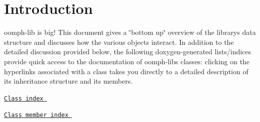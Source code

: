 \hypertarget{index_intro}{}\section{Introduction}\label{index_intro}
{\ttfamily oomph-\/lib} is big! This document gives a \char`\"{}bottom up\char`\"{} overview of the library\textquotesingle{}s data structure and discusses how the various objects interact. In addition to the detailed discussion provided below, the following doxygen-\/generated lists/indices provide quick access to the documentation of {\ttfamily oomph-\/lib\textquotesingle{}s} classes\+: clicking on the hyperlinks associated with a class takes you directly to a detailed description of its inheritance structure and its members.


\begin{DoxyItemize}
\item \href{../../the_data_structure/html/classes.html}{\tt Class index }


\item \href{../../the_data_structure/html/functions.html}{\tt Class member index }


\end{DoxyItemize}

